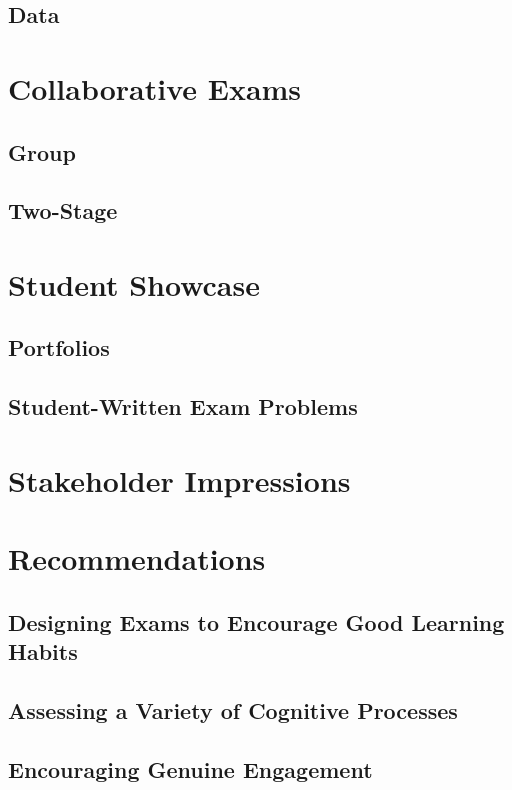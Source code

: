 \documentclass{article}
\begin{document}
\subsection{Data}

\section{Collaborative Exams}
\subsection{Group}
\subsection{Two-Stage}


\section{Student Showcase}
\subsection{Portfolios}
\subsection{Student-Written Exam Problems}


\section{Stakeholder Impressions}

\section{Recommendations}
\subsection{Designing Exams to Encourage Good Learning Habits}
\subsection{Assessing a Variety of Cognitive Processes}
\subsection{Encouraging Genuine Engagement}
\nocite{*}


\end{document}
